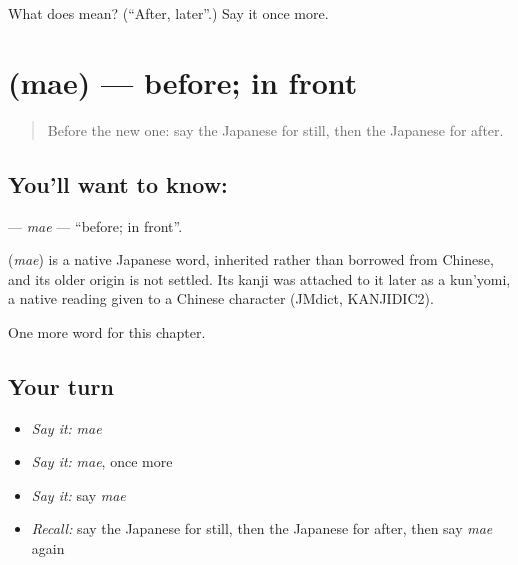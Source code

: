 \begin{tcolorbox}[breakable,colback=teal!4,colframe=teal!35!black,title={Before you move on}]
What does  mean? (\textquotedblleft{}After, later\textquotedblright{}.) Say it once more.
\end{tcolorbox}
\section[\texorpdfstring{\ja{まえ} (mae)}{まえ (mae)}]{ (mae) — before; in front}

\label{lesson:JA-C56-mae}



\begin{quote}
Before the new one: say the Japanese for still, then the Japanese for after.
\end{quote}

\subsection*{You'll want to know: }
\textbf{} — \emph{mae} — \textquotedblleft{}before; in front\textquotedblright{}.

\begin{cousinweb}
\textbf{} (\emph{mae}) is a native Japanese word, inherited rather than borrowed from Chinese, and its older origin is not settled. Its kanji was attached to it later as a kun'yomi, a native reading given to a Chinese character (JMdict, KANJIDIC2).
\end{cousinweb}

\begin{grammarlens}[title={What you've built}]
One more word for this chapter.
\end{grammarlens}

\subsection*{Your turn}
\begin{itemize}
\raggedright
  \item \emph{Say it:} \emph{mae}
  \item \emph{Say it:} \emph{mae}, once more
  \item \emph{Say it:} say \emph{mae}
  \item \emph{Recall:} say the Japanese for still, then the Japanese for after, then say \emph{mae} again
\end{itemize}

